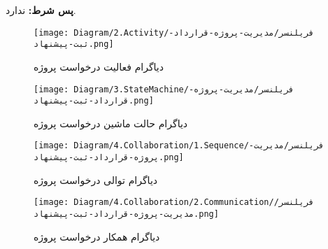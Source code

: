 \noindent
\textbf{پس شرط:}
ندارد.




\begin{figure}[H]
	\texttt{[image: Diagram/2.Activity/فریلنسر/مدیریت-پروژه-قرارداد-ثبت-پیشنهاد.png]}
	\centering
	\caption{دیاگرام فعالیت درخواست پروژه}
	\label{fig:a:درخواست-پروژه}
\end{figure}
\begin{figure}[H]
	\texttt{[image: Diagram/3.StateMachine/فریلنسر/مدیریت-پروژه-قرارداد-ثبت-پیشنهاد.png]}
	\centering
	\caption{دیاگرام حالت ماشین درخواست پروژه}
	\label{fig:sm:درخواست-پروژه}
\end{figure}
\begin{figure}[H]
	\texttt{[image: Diagram/4.Collaboration/1.Sequence/فریلنسر/مدیریت-پروژه-قرارداد-ثبت-پیشنهاد.png]}
	\caption{دیاگرام توالی درخواست پروژه}
	\centering
	\label{fig:s:درخواست-پروژه}
\end{figure}
\begin{figure}[H]
	\texttt{[image: Diagram/4.Collaboration/2.Communication/فریلنسر/مدیریت-پروژه-قرارداد-ثبت-پیشنهاد.png]}
	\centering
	\caption{دیاگرام همکار درخواست پروژه}
	\label{fig:c:درخواست-پروژه}
\end{figure}
